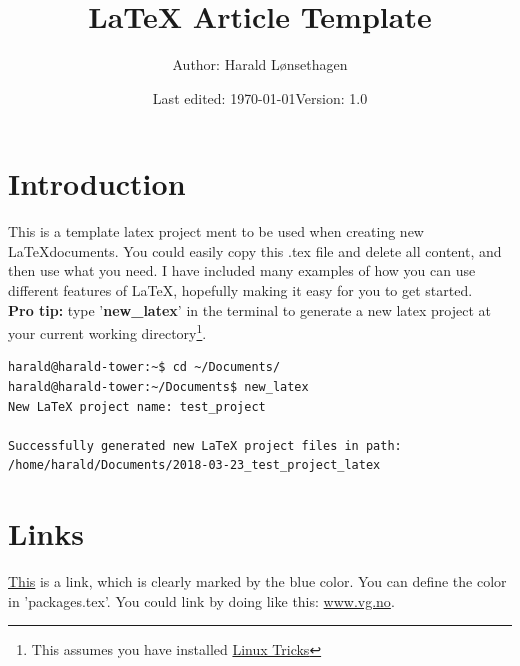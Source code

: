 



\title{\textbf{LaTeX Article Template}}
\author{Author: Harald Lønsethagen}
\date{Last edited: \today\tab Version: 1.0}

\maketitle


\makeatletter
\tableofcontents
\newpage

\section{Introduction}
This is a template latex project ment to be used when creating new \LaTeX \space documents. You could easily copy this .tex file and delete all content, and then use what you need. I have included many examples of how you can use different features of \LaTeX, hopefully making it easy for you to get started.\\
\textbf{Pro tip:} type '\textbf{new\_latex}' in the terminal to generate a new latex project at your current working directory\footnote{This assumes you have installed \href{https://github.com/Haraldlons/linux-tricks}{Linux Tricks}}.

\begin{lstlisting}[language=bash,caption={Example of getting started}]
harald@harald-tower:~$ cd ~/Documents/
harald@harald-tower:~/Documents$ new_latex
New LaTeX project name: test_project

Successfully generated new LaTeX project files in path:
/home/harald/Documents/2018-03-23_test_project_latex
\end{lstlisting}


\section{Links}
\href{www.vg.no}{This} is a link, which is clearly marked by the blue color. You can define the color in 'packages.tex'. You could link by doing like this: \url{www.vg.no}.
\newpage
